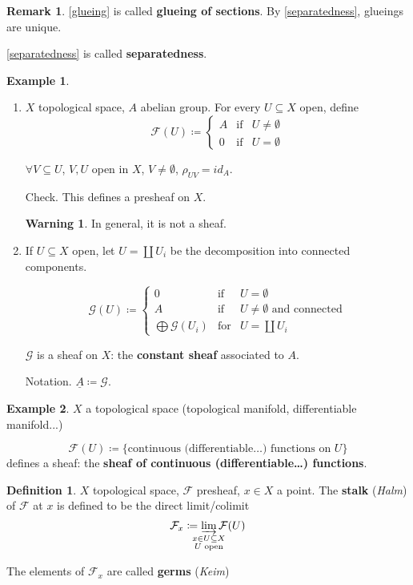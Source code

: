 \documentclass[12pt]{article}
\theoremstyle{definition}
\newtheorem*{definition}{Definition}
\newtheorem*{remark}{Remark}
\newtheorem*{warning}{Warning}
\newtheorem*{example}{Example}
\theoremstyle{remark}
\begin{document}
\begin{remark}
\ref{glueing} is called \textbf{glueing of sections}. By \ref{separatedness}, glueings are unique.

\ref{separatedness} is called \textbf{separatedness}.
\end{remark}

\begin{example}
\begin{enumerate}
\item $X$ topological space, $A$ abelian group. For every $U\subseteq X$ open, define
\[\mathcal{F}(U)\coloneqq\left\{\begin{array}{lll}A&\text{if}&U\neq\emptyset\\0&\text{if}&U=\emptyset\end{array}\right.\]

$\forall V\subseteq U$, $V,U$ open in $X$, $V\neq\emptyset$, $\rho_{UV}=id_A$.

Check. This defines a presheaf on $X$.

\begin{warning}
In general, it is not a sheaf.
\end{warning}

\item If $U\subseteq X$ open, let $U=\coprod U_i$ be the decomposition into connected components.

\[\mathcal{G}(U)\coloneqq\left\{\begin{array}{lll}0&\text{if}&U=\emptyset\\A&\text{if}&U\neq\emptyset\text{ and connected}\\\bigoplus\mathcal{G}(U_i)&\text{for}&U=\coprod U_i\end{array}\right.\]

$\mathcal{G}$ is a sheaf on $X$: the \textbf{constant sheaf} associated to $A$.

Notation. $\underline{A}\coloneqq\mathcal{G}$.
\end{enumerate}
\end{example}

\begin{example}
$X$ a topological space (topological manifold, differentiable manifold...)

\[\mathcal{F}(U)\coloneqq\{\text{continuous (differentiable\ldots) functions on }U\}\]
defines a sheaf: the \textbf{sheaf of continuous (differentiable\ldots) functions}.
\end{example}

\begin{definition}
$X$ topological space, $\mathcal{F}$ presheaf, $x\in X$ a point. The \textbf{stalk} (\emph{Halm}) of $\mathcal{F}$ at $x$ is defined to be the direct limit/colimit
\[\mathcal{F}_x\coloneqq\varinjlim_{\mathclap{\substack{x\in U\subseteq X\\U\text{ open}}}}\mathcal{F}(U)\]

The elements of $\mathcal{F}_x$ are called \textbf{germs} (\emph{Keim})
\end{definition}
\end{document}
